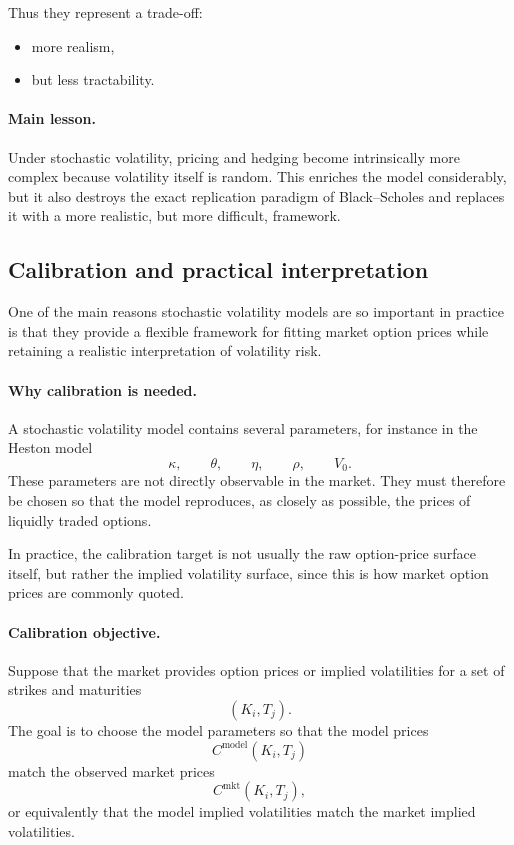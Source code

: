 \documentclass[11pt]{article}
\theoremstyle{plain}
\theoremstyle{definition}
\theoremstyle{remark}
\begin{document}
Thus they represent a trade-off:
\begin{itemize}[leftmargin=1.4em]
    \item more realism,
    \item but less tractability.
\end{itemize}

\paragraph{Main lesson.}

Under stochastic volatility, pricing and hedging become intrinsically
more complex because volatility itself is random.
This enriches the model considerably, but it also destroys the exact
replication paradigm of Black--Scholes and replaces it with a more
realistic, but more difficult, framework.

\subsection{Calibration and practical interpretation}

One of the main reasons stochastic volatility models are so important in
practice is that they provide a flexible framework for fitting market
option prices while retaining a realistic interpretation of volatility
risk.

\paragraph{Why calibration is needed.}

A stochastic volatility model contains several parameters, for instance
in the Heston model
\[
\kappa,\qquad \theta,\qquad \eta,\qquad \rho,\qquad V_0.
\]
These parameters are not directly observable in the market.
They must therefore be chosen so that the model reproduces, as closely
as possible, the prices of liquidly traded options.

In practice, the calibration target is not usually the raw option-price
surface itself, but rather the implied volatility surface, since this is
how market option prices are commonly quoted.

\paragraph{Calibration objective.}

Suppose that the market provides option prices or implied volatilities
for a set of strikes and maturities
\[
(K_i,T_j).
\]
The goal is to choose the model parameters so that the model prices
\[
C^{\mathrm{model}}(K_i,T_j)
\]
match the observed market prices
\[
C^{\mathrm{mkt}}(K_i,T_j),
\]
or equivalently that the model implied volatilities match the market
implied volatilities.
\end{document}
